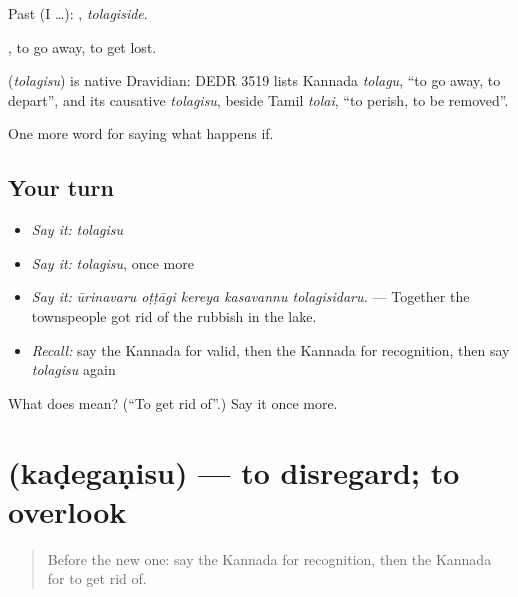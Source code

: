 Past (I …): , \emph{tolagiside}.

, to go away, to get lost.

\begin{cousinweb}
\textbf{} (\emph{tolagisu}) is native Dravidian: DEDR 3519 lists Kannada \emph{tolagu}, \textquotedblleft{}to go away, to depart\textquotedblright{}, and its causative \emph{tolagisu}, beside Tamil \emph{tolai}, \textquotedblleft{}to perish, to be removed\textquotedblright{}.
\end{cousinweb}

\begin{grammarlens}[title={What you've built}]
One more word for saying what happens if.
\end{grammarlens}

\subsection*{Your turn}
\begin{itemize}
\raggedright
  \item \emph{Say it:} \emph{tolagisu}
  \item \emph{Say it:} \emph{tolagisu}, once more
  \item \emph{Say it:} \emph{ūrinavaru oṭṭāgi kereya kasavannu tolagisidaru.} — Together the townspeople got rid of the rubbish in the lake.
  \item \emph{Recall:} say the Kannada for valid, then the Kannada for recognition, then say \emph{tolagisu} again
\end{itemize}

\begin{tcolorbox}[breakable,colback=teal!4,colframe=teal!35!black,title={Before you move on}]
What does  mean? (\textquotedblleft{}To get rid of\textquotedblright{}.) Say it once more.
\end{tcolorbox}
\section[\texorpdfstring{\kn{ಕಡೆಗಣಿಸು} (kaḍegaṇisu)}{ಕಡೆಗಣಿಸು (kaḍegaṇisu)}]{ (kaḍegaṇisu) — to disregard; to overlook}

\label{lesson:KA-C426-kadeganisu}



\begin{quote}
Before the new one: say the Kannada for recognition, then the Kannada for to get rid of.
\end{quote}

